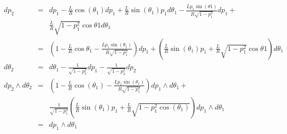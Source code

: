 {\begin{eqnarray}
dp_{2}&=&dp_{1}-\frac{L}{R}\cos(\theta_{1})dp_{1}+\frac{L}{R}\sin(\theta_{1})p_{1}d\theta_{1}-
\frac{Lp_{1}\sin(\theta{1})}{R\sqrt{1-p_{1}^{2}}}dp_{1}+
\\\nonumber&&\frac{L}{R}\sqrt{1-p_{1}^{2}}\cos{\theta{1}}d\theta_{1}\\\nonumber
&=&(1-\frac{L}{R}\cos{\theta_{1}}-\frac{Lp_{1}\sin(\theta_{1})}{R\sqrt{1-p_{1}^{2}}})dp_{1}
+(\frac{L}{R}\sin(\theta_{1})p_{1}+\frac{L}{R}\sqrt{1-p_{1}^{2}}\cos{\theta{1}})d\theta_{1}\\\nonumber
d\theta_{2}&=&d\theta_{1}-\frac{1}{\sqrt{1-p_{1}^{2}}}dp_{1}-\frac{1}{\sqrt{1-p_{2}^{2}}}dp_{2}\\\nonumber
dp_{2}\wedge d\theta_{2}&=& (1-\frac{L}{R}\cos(\theta_{1})-\frac{Lp_{1}\sin(\theta_{1})}{R\sqrt{1-p_{1}^{2}}})dp_{1}{\wedge}d\theta_{1}+
\\&&\frac{1}{\sqrt{1-p_{1}^{2}}}(\frac{L}{R}\sin(\theta_{1})p_{1}
+\frac{L}{R}\sqrt{1-p_{1}^{2}\cos(\theta_{1})})dp_{1}\wedge d\theta_{1}\\\nonumber
&=&dp_{1}\wedge d\theta_{1}
\end{eqnarray}
    }%